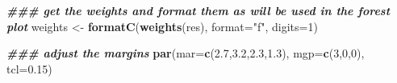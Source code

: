 \documentclass[
]{article}
\newenvironment{Shaded}{\begin{snugshade}}{\end{snugshade}}
\newcommand{\AttributeTok}[1]{\textcolor[rgb]{0.13,0.29,0.53}{#1}}
\newcommand{\DecValTok}[1]{\textcolor[rgb]{0.00,0.00,0.81}{#1}}
\newcommand{\DocumentationTok}[1]{\textcolor[rgb]{0.56,0.35,0.01}{\textbf{\textit{#1}}}}
\newcommand{\FloatTok}[1]{\textcolor[rgb]{0.00,0.00,0.81}{#1}}
\newcommand{\FunctionTok}[1]{\textcolor[rgb]{0.13,0.29,0.53}{\textbf{#1}}}
\newcommand{\NormalTok}[1]{#1}
\newcommand{\OtherTok}[1]{\textcolor[rgb]{0.56,0.35,0.01}{#1}}
\newcommand{\StringTok}[1]{\textcolor[rgb]{0.31,0.60,0.02}{#1}}
\begin{document}
\begin{Shaded}
\begin{Highlighting}[]
\DocumentationTok{\#\#\# get the weights and format them as will be used in the forest plot}
\NormalTok{weights }\OtherTok{\textless{}{-}} \FunctionTok{formatC}\NormalTok{(}\FunctionTok{weights}\NormalTok{(res), }\AttributeTok{format=}\StringTok{"f"}\NormalTok{, }\AttributeTok{digits=}\DecValTok{1}\NormalTok{)}
 
\DocumentationTok{\#\#\# adjust the margins}
\FunctionTok{par}\NormalTok{(}\AttributeTok{mar=}\FunctionTok{c}\NormalTok{(}\FloatTok{2.7}\NormalTok{,}\FloatTok{3.2}\NormalTok{,}\FloatTok{2.3}\NormalTok{,}\FloatTok{1.3}\NormalTok{), }\AttributeTok{mgp=}\FunctionTok{c}\NormalTok{(}\DecValTok{3}\NormalTok{,}\DecValTok{0}\NormalTok{,}\DecValTok{0}\NormalTok{), }\AttributeTok{tcl=}\FloatTok{0.15}\NormalTok{)}
\end{Highlighting}
\end{Shaded}
\end{document}
